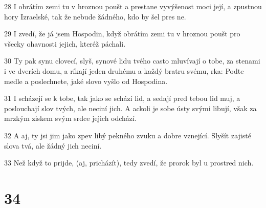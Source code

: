 \par 28 I obrátím zemi tu v hroznou poušt a prestane vyvýšenost moci její, a zpustnou hory Izraelské, tak že nebude žádného, kdo by šel pres ne.
\par 29 I zvedí, že já jsem Hospodin, když obrátím zemi tu v hroznou poušt pro všecky ohavnosti jejich, kteréž páchali.
\par 30 Ty pak synu clovecí, slyš, synové lidu tvého casto mluvívají o tobe, za stenami i ve dverích domu, a ríkají jeden druhému a každý bratru svému, rka: Podte medle a poslechnete, jaké slovo vyšlo od Hospodina.
\par 31 I scházejí se k tobe, tak jako se schází lid, a sedají pred tebou lid muj, a poslouchají slov tvých, ale neciní jich. A ackoli je sobe ústy svými libují, však za mrzkým ziskem svým srdce jejich odchází.
\par 32 A aj, ty jsi jim jako zpev libý pekného zvuku a dobre vznející. Slyšít zajisté slova tvá, ale žádný jich neciní.
\par 33 Než když to prijde, (aj, pricházít), tedy zvedí, že prorok byl u prostred nich.

\chapter{34}

